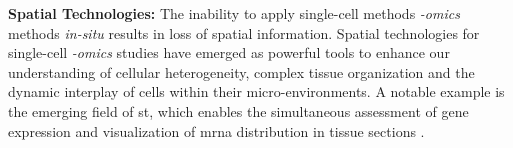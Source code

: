 \textbf{Spatial Technologies: } %
The inability to apply single-cell methods \textit{-omics} methods \textit{in-situ} results in loss of spatial information. Spatial technologies for single-cell \textit{-omics} studies have emerged as powerful tools to enhance our understanding of cellular heterogeneity, complex tissue organization and the dynamic interplay of cells within their micro-environments. A notable example is the emerging field of \gls{st}, which enables the simultaneous assessment of gene expression and visualization of \gls{mrna} distribution in tissue sections \textbf{\cite{moses_museum_2022,tian_expanding_2023}}.\\ %








